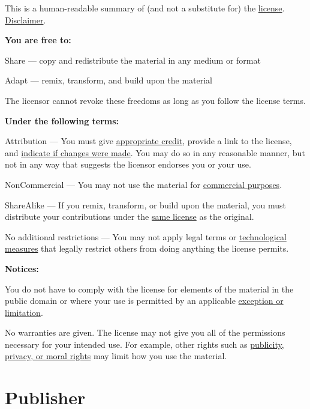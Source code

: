 \documentclass[
]{book}
\begin{document}
This is a human-readable summary of (and not a substitute for) the \href{https://creativecommons.org/licenses/by-nc-sa/4.0/legalcode}{license}. \href{https://creativecommons.org/licenses/by-nc-sa/4.0/\#}{Disclaimer}.

\textbf{You are free to:}

Share --- copy and redistribute the material in any medium or format

Adapt --- remix, transform, and build upon the material

The licensor cannot revoke these freedoms as long as you follow the license terms.

\textbf{Under the following terms:}

Attribution --- You must give \href{https://creativecommons.org/licenses/by-nc-sa/4.0/\#}{appropriate credit}, provide a link to the license, and \href{https://creativecommons.org/licenses/by-nc-sa/4.0/\#}{indicate if changes were made}. You may do so in any reasonable manner, but not in any way that suggests the licensor endorses you or your use.

NonCommercial --- You may not use the material for \href{https://creativecommons.org/licenses/by-nc-sa/4.0/\#}{commercial purposes}.

ShareAlike --- If you remix, transform, or build upon the material, you must distribute your contributions under the \href{https://creativecommons.org/licenses/by-nc-sa/4.0/\#}{same license} as the original.

No additional restrictions --- You may not apply legal terms or \href{https://creativecommons.org/licenses/by-nc-sa/4.0/\#}{technological measures} that legally restrict others from doing anything the license permits.

\textbf{Notices:}

You do not have to comply with the license for elements of the material in the public domain or where your use is permitted by an applicable \href{https://creativecommons.org/licenses/by-nc-sa/4.0/\#}{exception or limitation}.

No warranties are given. The license may not give you all of the permissions necessary for your intended use. For example, other rights such as \href{https://creativecommons.org/licenses/by-nc-sa/4.0/\#}{publicity, privacy, or moral rights} may limit how you use the material.

\hypertarget{publisher}{%
\section*{Publisher}\label{publisher}}
\end{document}
